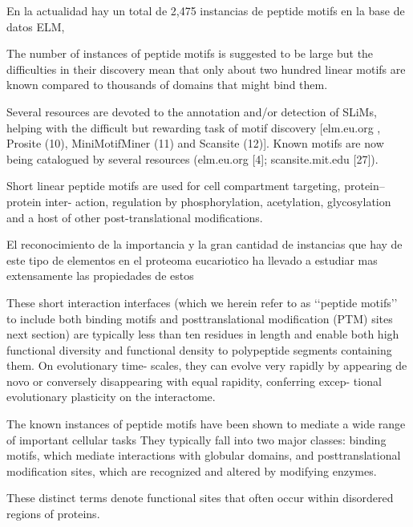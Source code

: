 En la actualidad hay un total de 2,475 instancias de peptide motifs en la base de datos ELM,



The number of instances of peptide motifs is suggested to be large \cite{tompa2014million}
but the difficulties in their discovery
mean that only about two hundred  %
linear motifs are known
compared to thousands of domains that might bind them.


Several resources are devoted to the annotation and/or detection of SLiMs, helping with the difficult but rewarding task of motif discovery [elm.eu.org , Prosite (10), MiniMotifMiner (11) and Scansite (12)].
Known motifs are now being catalogued by several resources
(elm.eu.org [4]; scansite.mit.edu [27]).


Short linear peptide motifs are used
for cell compartment targeting, protein–protein inter-
action, regulation by phosphorylation, acetylation,
glycosylation and a host of other post-translational
modifications.








% 

El reconocimiento de la importancia y la gran cantidad de instancias que hay de este tipo de elementos en el proteoma eucariotico ha llevado a estudiar mas extensamente las propiedades de estos \cite{davey2012attributes}

These short interaction interfaces (which we herein refer to as ‘‘peptide motifs’’ to include both binding
motifs and posttranslational modification (PTM) sites 
next section) are typically less than ten residues in length and
enable both high functional diversity and functional density to
polypeptide segments containing them. On evolutionary time-
scales, they can evolve very rapidly by appearing de novo or
conversely disappearing with equal rapidity, conferring excep-
tional evolutionary plasticity on the interactome.

The known instances of peptide motifs have been shown to
mediate a wide range of important cellular tasks
They typically fall into two major classes: binding motifs, which mediate interactions with globular domains, and
posttranslational modification sites, which are recognized and altered by modifying enzymes.

These distinct terms denote functional sites
that often occur within disordered regions of proteins. 

